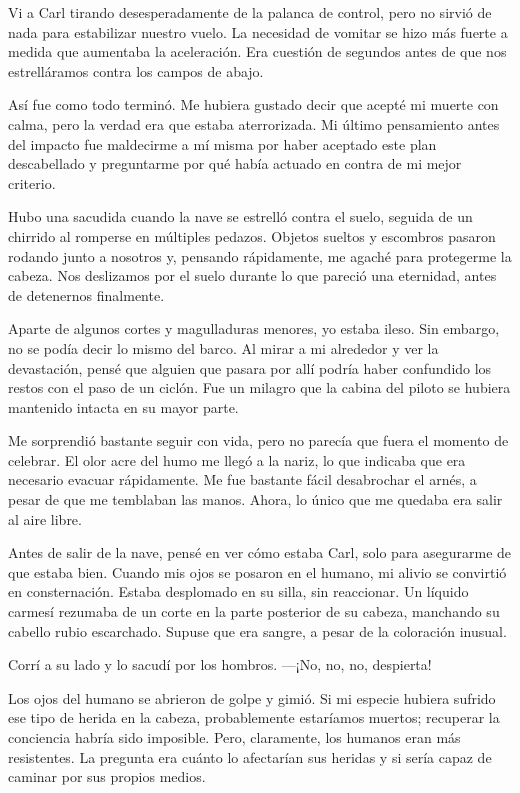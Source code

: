 Vi a Carl tirando desesperadamente de la palanca de control, pero no sirvió de nada para estabilizar nuestro vuelo. La necesidad de vomitar se hizo más fuerte a medida que aumentaba la aceleración. Era cuestión de segundos antes de que nos estrelláramos contra los campos de abajo.

Así fue como todo terminó. Me hubiera gustado decir que acepté mi muerte con calma, pero la verdad era que estaba aterrorizada. Mi último pensamiento antes del impacto fue maldecirme a mí misma por haber aceptado este plan descabellado y preguntarme por qué había actuado en contra de mi mejor criterio.

Hubo una sacudida cuando la nave se estrelló contra el suelo, seguida de un chirrido al romperse en múltiples pedazos. Objetos sueltos y escombros pasaron rodando junto a nosotros y, pensando rápidamente, me agaché para protegerme la cabeza. Nos deslizamos por el suelo durante lo que pareció una eternidad, antes de detenernos finalmente.

Aparte de algunos cortes y magulladuras menores, yo estaba ileso. Sin embargo, no se podía decir lo mismo del barco. Al mirar a mi alrededor y ver la devastación, pensé que alguien que pasara por allí podría haber confundido los restos con el paso de un ciclón. Fue un milagro que la cabina del piloto se hubiera mantenido intacta en su mayor parte.

Me sorprendió bastante seguir con vida, pero no parecía que fuera el momento de celebrar. El olor acre del humo me llegó a la nariz, lo que indicaba que era necesario evacuar rápidamente. Me fue bastante fácil desabrochar el arnés, a pesar de que me temblaban las manos. Ahora, lo único que me quedaba era salir al aire libre.

Antes de salir de la nave, pensé en ver cómo estaba Carl, solo para asegurarme de que estaba bien. Cuando mis ojos se posaron en el humano, mi alivio se convirtió en consternación. Estaba desplomado en su silla, sin reaccionar. Un líquido carmesí rezumaba de un corte en la parte posterior de su cabeza, manchando su cabello rubio escarchado. Supuse que era sangre, a pesar de la coloración inusual.

Corrí a su lado y lo sacudí por los hombros. —¡No, no, no, despierta!

Los ojos del humano se abrieron de golpe y gimió. Si mi especie hubiera sufrido ese tipo de herida en la cabeza, probablemente estaríamos muertos; recuperar la conciencia habría sido imposible. Pero, claramente, los humanos eran más resistentes. La pregunta era cuánto lo afectarían sus heridas y si sería capaz de caminar por sus propios medios.


